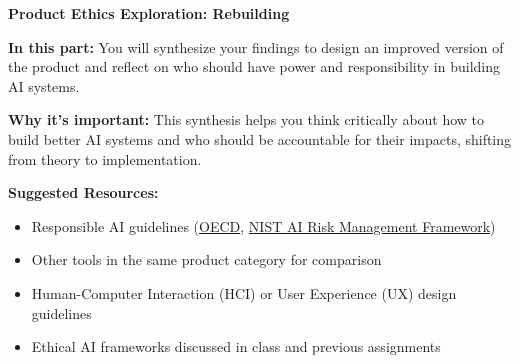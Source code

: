 \item {\bf Product Ethics Exploration: Rebuilding}

\textbf{In this part:} You will synthesize your findings to design an improved version of the product and reflect on who should have power and responsibility in building AI systems.

\vspace{2mm}

\textbf{Why it's important:} This synthesis helps you think critically about how to build better AI systems and who should be accountable for their impacts, shifting from theory to implementation.

\vspace{2mm}

\textbf{Suggested Resources:}
\begin{itemize}
  \item Responsible AI guidelines (\href{https://www.oecd.org/en/topics/sub-issues/ai-principles.html}{OECD}, \href{https://www.nist.gov/itl/ai-risk-management-framework}{NIST AI Risk Management Framework})
  \item Other tools in the same product category for comparison
  \item Human-Computer Interaction (HCI) or User Experience (UX) design guidelines
  \item Ethical AI frameworks discussed in class and previous assignments
\end{itemize}

\begin{enumerate}
    
    
\end{enumerate}